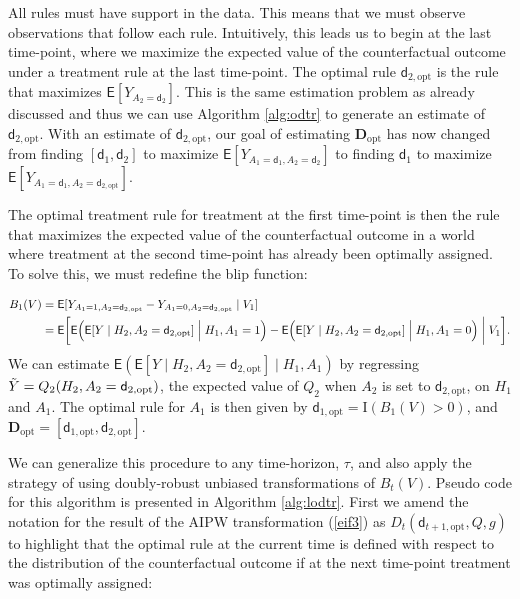 \documentclass[11pt]{article}
\renewcommand{\d}{\mathsf{d}}
\newcommand{\E}{\mathsf{E}}
\theoremstyle{example}
\begin{document}
All rules must have support in the data. This means that we must observe observations that follow each rule. Intuitively, this leads us to begin at the last time-point, where we maximize the expected value of the counterfactual outcome under a treatment rule at the last time-point. The optimal rule $\d_{2, \text{opt}}$ is the rule that maximizes $\E[Y_{A_2 = \d_2}]$. This is the same estimation problem as already discussed and thus we can use Algorithm \ref{alg:odtr} to generate an estimate of $\d_{2, \text{opt}}$. With an estimate of $ \d_{2, \text{opt}}$, our goal of estimating $\mathbf{D}_{\text{opt}}$ has now changed from finding $[\d_1, \d_2]$ to maximize $\E[Y_{A_1 = \d_1, A_2 = \d_2}]$ to finding $\d_1$ to maximize $\E[Y_{A_1 = \d_1, A_2 = \d_{2, \text{opt}}}]$.

The optimal treatment rule for treatment at the first time-point is then the rule that maximizes the expected value of the counterfactual outcome in a world where treatment at the second time-point has already been optimally assigned. To solve this, we must redefine the blip function:

\begin{equation*}
    \begin{split}
        B_1(V) &= \E[Y_{A_1 = 1, A_2 = \d_{2, \text{opt}}} - Y_{A_1 = 0, A_2 = \d_{2, \text{opt}}} \mid V_1] \\
     &= \E\bigg[\E\Big(\E[Y \mid H_2, A_2 = \d_{2, \text{opt}}] \Bigm| H_1, A_1 = 1 \Big) - \E\Big(\E[Y \mid H_2, A_2 = \d_{2, \text{opt}}] \Bigm| H_1, A_1 = 0 \Big) \biggm| V_1 \bigg].
\end{split}
\end{equation*}
We can estimate $\E(\E[Y \mid H_2, A_2 = \d_{2, \text{opt}}] \mid H_1, A_1)$ by regressing $\Tilde{Y} = Q_2(H_2, A_2 = \d_{2, \text{opt}})$, the expected value of $Q_2$ when $A_2$ is set to $\d_{2, \text{opt}}$, %
on $H_1$ and $A_1$. The optimal rule for $A_1$ is then given by $\d_{1, \text{opt}} = \mathrm{I}(B_1(V) > 0)$, and $\mathbf{D}_{\text{opt}} = [\d_{1, \text{opt}}, \d_{2, \text{opt}}]$.

We can generalize this procedure to any time-horizon, $\tau$, and also apply the strategy of using doubly-robust unbiased transformations of $B_t(V)$. Pseudo code for this algorithm is presented in Algorithm \ref{alg:lodtr}. First we amend the notation for the result of the AIPW transformation\citep{luedtkeSLodtr} (\ref{eif3}) as $D_t(\d_{t+1, \text{opt}}, Q, g)$ to highlight that the optimal rule at the current time is defined with respect to the distribution of the counterfactual outcome if at the next time-point treatment was optimally assigned:
\end{document}
